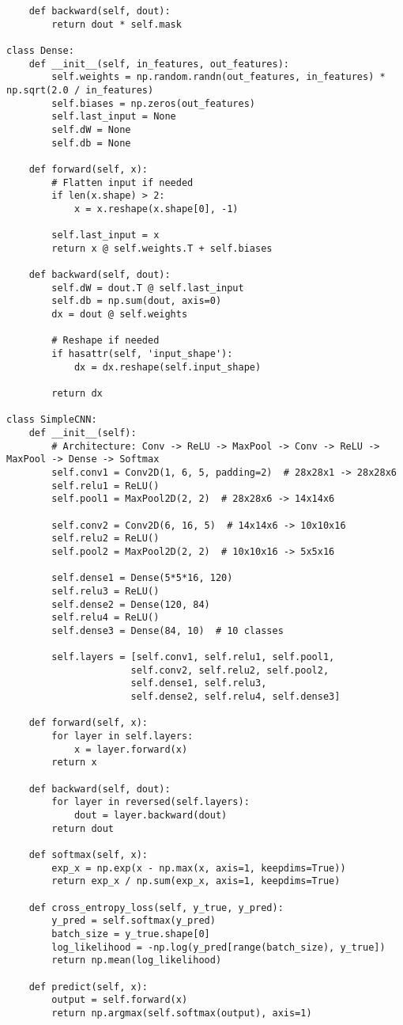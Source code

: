 ﻿\documentclass[12pt,a4paper]{article}
\begin{document}
\begin{lstlisting}
    def backward(self, dout):
        return dout * self.mask

class Dense:
    def __init__(self, in_features, out_features):
        self.weights = np.random.randn(out_features, in_features) * np.sqrt(2.0 / in_features)
        self.biases = np.zeros(out_features)
        self.last_input = None
        self.dW = None
        self.db = None
    
    def forward(self, x):
        # Flatten input if needed
        if len(x.shape) > 2:
            x = x.reshape(x.shape[0], -1)
        
        self.last_input = x
        return x @ self.weights.T + self.biases
    
    def backward(self, dout):
        self.dW = dout.T @ self.last_input
        self.db = np.sum(dout, axis=0)
        dx = dout @ self.weights
        
        # Reshape if needed
        if hasattr(self, 'input_shape'):
            dx = dx.reshape(self.input_shape)
        
        return dx

class SimpleCNN:
    def __init__(self):
        # Architecture: Conv -> ReLU -> MaxPool -> Conv -> ReLU -> MaxPool -> Dense -> Softmax
        self.conv1 = Conv2D(1, 6, 5, padding=2)  # 28x28x1 -> 28x28x6
        self.relu1 = ReLU()
        self.pool1 = MaxPool2D(2, 2)  # 28x28x6 -> 14x14x6
        
        self.conv2 = Conv2D(6, 16, 5)  # 14x14x6 -> 10x10x16
        self.relu2 = ReLU()
        self.pool2 = MaxPool2D(2, 2)  # 10x10x16 -> 5x5x16
        
        self.dense1 = Dense(5*5*16, 120)
        self.relu3 = ReLU()
        self.dense2 = Dense(120, 84)
        self.relu4 = ReLU()
        self.dense3 = Dense(84, 10)  # 10 classes
        
        self.layers = [self.conv1, self.relu1, self.pool1,
                      self.conv2, self.relu2, self.pool2,
                      self.dense1, self.relu3,
                      self.dense2, self.relu4, self.dense3]
    
    def forward(self, x):
        for layer in self.layers:
            x = layer.forward(x)
        return x
    
    def backward(self, dout):
        for layer in reversed(self.layers):
            dout = layer.backward(dout)
        return dout
    
    def softmax(self, x):
        exp_x = np.exp(x - np.max(x, axis=1, keepdims=True))
        return exp_x / np.sum(exp_x, axis=1, keepdims=True)
    
    def cross_entropy_loss(self, y_true, y_pred):
        y_pred = self.softmax(y_pred)
        batch_size = y_true.shape[0]
        log_likelihood = -np.log(y_pred[range(batch_size), y_true])
        return np.mean(log_likelihood)
    
    def predict(self, x):
        output = self.forward(x)
        return np.argmax(self.softmax(output), axis=1)
\end{lstlisting}
\end{document}
